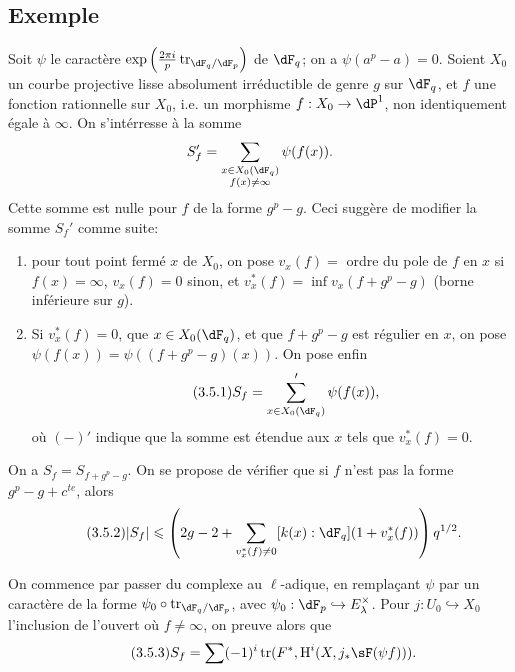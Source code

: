 \subsection{Exemple}\label{VI:3-5}

Soit $\psi$ le caract\`ere 
$\exp\left(\frac{2\pi i}{p} \tr_{\dF_q/\dF_p}\right)$ de $\dF_q$; on a 
$\psi(a^p-a)=0$. Soient $X_0$ un courbe projective lisse absolument 
irr\'eductible de genre $g$ sur $\dF_q$, et $f$ une fonction rationnelle sur 
$X_0$, i.e. un morphisme $f:X_0 \to \dP^1$, non identiquement \'egale \`a 
$\infty$. On s'int\'erresse \`a la somme 
\[
  S_f' = \sum_{\substack{x\in X_0(\dF_q) \\ f(x)\ne \infty}} \psi(f(x)) 
  \text{.}
\]
Cette somme est nulle pour $f$ de la forme $g^p-g$. Ceci sugg\`ere de 
modifier la somme $S_f'$ comme suite: 
\begin{enumerate}[\indent a)]
  \item pour tout point ferm\'e $x$ de $X_0$, on pose $v_x(f) = $ ordre du 
    pole de $f$ en $x$ si $f(x)=\infty$, $v_x(f)=0$ sinon, et 
    $v_x^\ast(f) = \inf v_x(f+g^p-g)$ (borne inf\'erieure sur $g$). 
  \item Si $v_x^\ast(f)=0$, que $x\in X_0(\dF_q)$, et que $f+g^p-g$ est 
    r\'egulier en $x$, on pose $\psi(f(x)) = \psi((f+g^p-g)(x))$. On pose enfin 
    \begin{equation*}\tag{3.5.1}\label{VI:eq:3-5-1}
      S_f = \sum'_{x\in X_0(\dF_q)} \psi(f(x)) \text{,}
    \end{equation*}
    o\`u $(-)'$ indique que la somme est \'etendue aux $x$ tels que 
    $v_x^\ast(f)=0$. 
\end{enumerate}

On a $S_f=S_{f+g^p-g}$. On se propose de v\'erifier que si $f$ n'est pas la 
forme $g^p-g+c^{t e}$, alors 
\begin{equation*}\tag{3.5.2}\label{VI:eq:3-5-2}
  |S_f|\leqslant \left(2 g-2+\sum_{v_x^\ast(f)\ne 0} [k(x):\dF_q] (1+v_x^\ast(f))\right) q^{1/2} \text{.}
\end{equation*}

On commence par passer du complexe au $\ell$-adique, en remplaçant $\psi$ par 
un caract\`ere de la forme $\psi_0\circ \tr_{\dF_q/\dF_p}$, avec 
$\psi_0:\dF_p\hookrightarrow E_\lambda^\times$. Pour $j:U_0\hookrightarrow X_0$ 
l'inclusion de l'ouvert o\`u $f\ne\infty$, on preuve alors que 
\begin{equation*}\tag{3.5.3}\label{VI:eq:3-5-3}
  S_f = \sum (-1)^i \tr(F^\ast,\h^i(X,j_\ast \sF(\psi f))) \text{.} 
\end{equation*}

